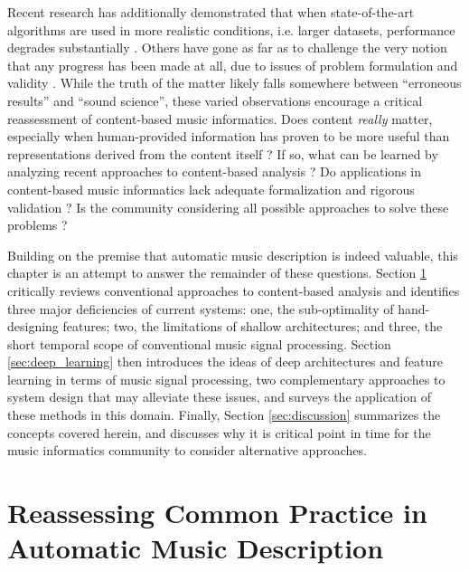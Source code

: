 Recent research has additionally demonstrated that when state-of-the-art algorithms are used in more realistic conditions, i.e. larger datasets, performance degrades substantially \cite{BertinMahieux2012Largescale}.
Others have gone as far as to challenge the very notion that any progress has been made at all, due to issues of problem formulation and validity \cite{Sturm2014State}.
While the truth of the matter likely falls somewhere between ``erroneous results'' and ``sound science'', these varied observations encourage a critical reassessment of content-based music informatics.
Does content \emph{really} matter, especially when human-provided information has proven to be more useful than representations derived from the content itself \cite{Slaney2011Webscale}?
If so, what can be learned by analyzing recent approaches to content-based analysis \cite{Flexer2012MIREX}?
Do applications in content-based music informatics lack adequate formalization and rigorous validation \cite{Sturm2014Kiki}?
Is the community considering all possible approaches to solve these problems \cite{Humphrey2012Moving}?

Building on the premise that automatic music description is indeed valuable, this chapter is an attempt to answer the remainder of these questions.
Section \ref{sec:common} critically reviews conventional approaches to content-based analysis and identifies three major deficiencies of current systems:
one, the sub-optimality of hand-designing features;
two, the limitations of shallow architectures;
and three, the short temporal scope of conventional music signal processing.
Section \ref{sec:deep_learning} then introduces the ideas of deep architectures and feature learning in terms of music signal processing, two complementary approaches to system design that may alleviate these issues, and surveys the application of these methods in this domain.
Finally, Section \ref{sec:discussion} summarizes the concepts covered herein, and discusses why it is critical point in time for the music informatics community to consider alternative approaches.


\section{Reassessing Common Practice in Automatic Music Description}
\label{sec:common}

